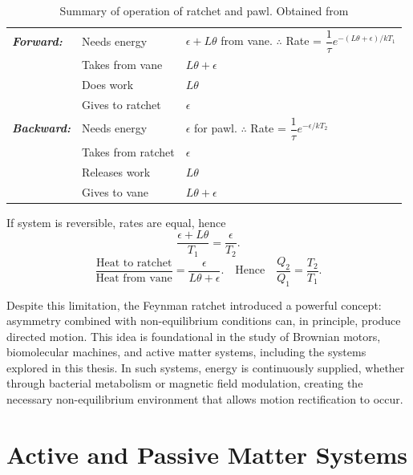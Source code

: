 \begin{table}[ht]
\centering
\renewcommand{\arraystretch}{1.4}
\caption[Summary of operation of ratchet and pawl.]{Summary of operation of ratchet and pawl. Obtained from \cite{feynman1963feynman}}
\label{tab:ratchet_pawl}
\begin{tabular}{>{\itshape}l l l}
\toprule
\textbf{Forward:} & Needs energy & $\epsilon + L \theta$ from vane. \quad $\therefore$ Rate = $\dfrac{1}{\tau} e^{-(L\theta + \epsilon)/kT_1}$ \\
                  & Takes from vane & $L\theta + \epsilon$ \\
                  & Does work & $L\theta$ \\
                  & Gives to ratchet & $\epsilon$ \\
\midrule
\textbf{Backward:} & Needs energy & $\epsilon$ for pawl. \quad $\therefore$ Rate = $\dfrac{1}{\tau} e^{-\epsilon/kT_2}$ \\
                   & Takes from ratchet & $\epsilon$ \\
                   & Releases work & $L\theta$ \\
                   & Gives to vane & $L\theta + \epsilon$ \\
\bottomrule
\end{tabular}

\vspace{1em}
If system is reversible, rates are equal, hence 
\[
\frac{\epsilon + L\theta}{T_1} = \frac{\epsilon}{T_2}.
\]
\[
\frac{\text{Heat to ratchet}}{\text{Heat from vane}} = \frac{\epsilon}{L\theta + \epsilon}.
\quad \text{Hence} \quad \frac{Q_2}{Q_1} = \frac{T_2}{T_1}.
\]
\end{table}

Despite this limitation, the Feynman ratchet introduced a powerful concept: asymmetry combined with non-equilibrium conditions can, in principle, produce directed motion. This idea is foundational in the study of Brownian motors, biomolecular machines, and active matter systems, including the systems explored in this thesis. In such systems, energy is continuously supplied, whether through bacterial metabolism or magnetic field modulation, creating the necessary non-equilibrium environment that allows motion rectification to occur.

\chapter{Active and Passive Matter Systems}
\label{ch:activeandpassivemattersystems}

